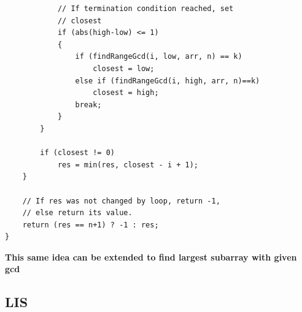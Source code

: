 \documentclass[8pt, a4paper, oneside, twocolumn]{extarticle}
\begin{document}
\begin{verbatim}
            // If termination condition reached, set 
            // closest 
            if (abs(high-low) <= 1) 
            { 
                if (findRangeGcd(i, low, arr, n) == k) 
                    closest = low; 
                else if (findRangeGcd(i, high, arr, n)==k) 
                    closest = high; 
                break; 
            } 
        } 
  
        if (closest != 0) 
            res = min(res, closest - i + 1); 
    } 
  
    // If res was not changed by loop, return -1, 
    // else return its value. 
    return (res == n+1) ? -1 : res; 
} 
\end{verbatim}
\textbf{This same idea can be extended to find largest subarray with given gcd}
\subsection{LIS}
\end{document}
